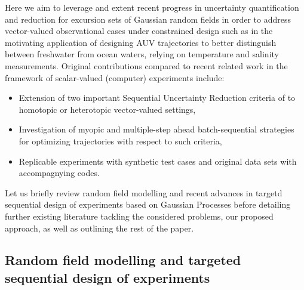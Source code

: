 \documentclass[aoas]{imsart}
\begin{document}
Here we aim to leverage and extent recent progress in uncertainty quantification and reduction for excursion sets of Gaussian random fields in order to address vector-valued observational cases under constrained design such as in the motivating application of designing AUV trajectories to better distinguish between freshwater from ocean waters, relying on temperature and salinity measurements. %
Original contributions compared to recent related work in the framework of scalar-valued (computer) experiments include: 
\begin{itemize}
    \item Extension of two important Sequential Uncertainty Reduction criteria of \citep{Bect.etal2012,chevalier2014fast,bect2019} to homotopic or heterotopic vector-valued settings,
    \item Investigation of myopic and multiple-step ahead batch-sequential strategies for optimizing trajectories with respect to such criteria,
    \item Replicable experiments with synthetic test cases and original data sets with accompagnying codes. 
\end{itemize}
Let us briefly review random field modelling and recent advances in targetd sequential design of experiments based on Gaussian Processes before detailing further existing literature tackling the considered problems, our proposed approach, as well as outlining the rest of the paper.  


\subsection{Random field modelling and targeted sequential design of experiments}
 
\end{document}
